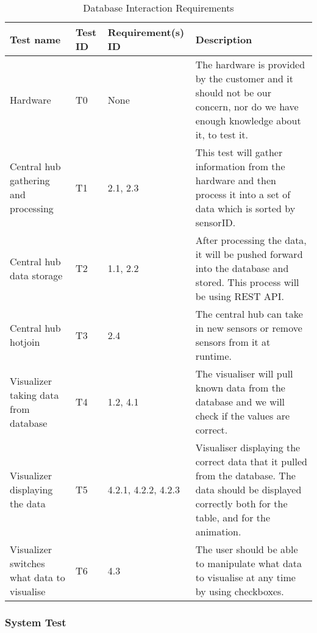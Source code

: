 \documentclass[../document]{subfiles}
\begin{document}
\begin{table}[H]
\caption{Database Interaction Requirements}
\centering
\begin{tabularx}{\textwidth}{|L{2cm}|l|L{2.2cm}|X|}
	\hline
	Test name
	&Test ID
	&Requirement(s) ID
	&Description
	\\ \hline Hardware
	&T0
	&None
	&The hardware is provided by the customer and it should not be our concern, nor do we have enough knowledge about it, to test it.
	\\ \hline Central hub gathering and processing
	&T1
	&2.1, 2.3
	&This test will gather information from the hardware and then process it into a set of data which is sorted by sensorID.
	\\ \hline Central hub data storage
	&T2
	&1.1, 2.2
	&After processing the data, it will be pushed forward into the database and stored. This process will be using REST API.
	\\ \hline Central hub hotjoin
	&T3
	&2.4
	&The central hub can take in new sensors or remove sensors from it at runtime.
	\\ \hline Visualizer taking data from database
	&T4
	&1.2, 4.1
	&The visualiser will pull known data from the database and we will check if the values are correct.
	\\ \hline Visualizer displaying the data
	&T5
	&4.2.1, 4.2.2, 4.2.3
	&Visualiser displaying the correct data that it pulled from the database. The data should be displayed correctly both for the table, and for the animation.
	\\ \hline Visualizer switches what data to visualise
	&T6
	&4.3
	&The user should be able to manipulate what data to visualise at any time by using checkboxes.
	\\ \hline 
\end{tabularx}
\end{table}

\subsubsection{System Test}
\end{document}
